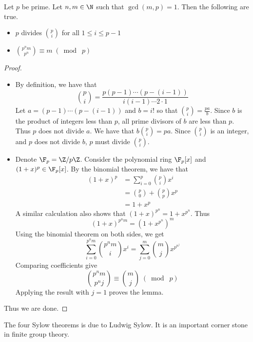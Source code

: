 \documentclass[a4paper]{article}
\begin{document}
\begin{lmm}{}{} Let $p$ be prime. Let $n,m\in\N$ such that $\gcd(m,p)=1$. Then the following are true. 
\begin{itemize}
\item $p$ divides $\binom{p}{i}$ for all $1\leq i\leq p-1$
\item $\binom{p^nm}{p^n}\equiv m\;(\bmod\;p)$
\end{itemize} \tcbline
\begin{proof}~\\
\begin{itemize}
\item By definition, we have that $$\binom{p}{i}=\frac{p(p-1)\cdots(p-(i-1))}{i(i-1)\cdots2\cdot 1}$$ Let $a=(p-1)\cdots(p-(i-1))$ and $b=i!$ so that $\binom{p}{i}=\frac{pa}{b}$. Since $b$ is the product of integers less than $p$, all prime divisors of $b$ are less than $p$. Thus $p$ does not divide $a$. We have that $b\binom{p}{i}=pa$. Since $\binom{p}{i}$ is an integer, and $p$ does not divide $b$, $p$ must divide $\binom{p}{i}$. 
\item Denote $\F_p=\Z/p\Z$. Consider the polynomial ring $\F_p[x]$ and $(1+x)^p\in\F_p[x]$. By the binomial theorem, we have that 
\begin{align*}
(1+x)^p&=\sum_{i=0}^p\binom{p}{i}x^i\\
&=\binom{p}{0}+\binom{p}{p}x^p\\
&=1+x^p
\end{align*}
A similar calculation also shows that $(1+x)^{p^n}=1+x^{p^n}$. Thus $$(1+x)^{p^nm}=(1+x^{p^n})^m$$ Using the binomial theorem on both sides, we get $$\sum_{i=0}^{p^nm}\binom{p^nm}{i}x^i=\sum_{j=0}^m\binom{m}{j}x^{p^{n^j}}$$ Comparing coefficients give $$\binom{p^nm}{p^nj}\equiv\binom{m}{j}\;(\bmod\;p)$$ Applying the result with $j=1$ proves the lemma. 
\end{itemize}
Thus we are done. 
\end{proof}
\end{lmm}

The four Sylow theorems is due to Ludwig Sylow. It is an important corner stone in finite group theory. 
\end{document}

